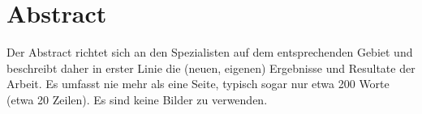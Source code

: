 \section{Abstract}
Der Abstract richtet sich an den Spezialisten auf dem entsprechenden Gebiet und 
beschreibt daher in erster Linie die (neuen, eigenen) Ergebnisse und Resultate der 
Arbeit. Es umfasst nie mehr als eine Seite, typisch sogar nur etwa 200 Worte (etwa 
20 Zeilen). Es sind keine Bilder zu verwenden.